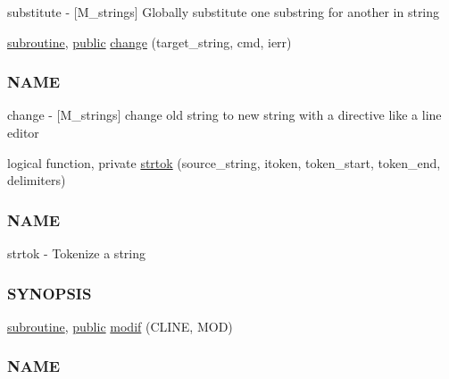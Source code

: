\begin{DoxyCompactItemize}
\begin{DoxyCompactList}
substitute -\/ \mbox{[}M\+\_\+strings\mbox{]} Globally substitute one substring for another in string \end{DoxyCompactList}\item 
\hyperlink{M__stopwatch_83_8txt_acfbcff50169d691ff02d4a123ed70482}{subroutine}, \hyperlink{M__stopwatch_83_8txt_a2f74811300c361e53b430611a7d1769f}{public} \hyperlink{namespacem__strings_a1222f3b718f7637105bde330367925e1}{change} (target\+\_\+string, cmd, ierr)
\begin{DoxyCompactList}\small\item\em \subsubsection*{N\+A\+ME}

change -\/ \mbox{[}M\+\_\+strings\mbox{]} change old string to new string with a directive like a line editor \end{DoxyCompactList}\item 
logical function, private \hyperlink{namespacem__strings_a9a923829f31ea70ecada6d214536a704}{strtok} (source\+\_\+string, itoken, token\+\_\+start, token\+\_\+end, delimiters)
\begin{DoxyCompactList}\small\item\em \subsubsection*{N\+A\+ME}

strtok -\/ Tokenize a string \subsubsection*{S\+Y\+N\+O\+P\+S\+IS}\end{DoxyCompactList}\item 
\hyperlink{M__stopwatch_83_8txt_acfbcff50169d691ff02d4a123ed70482}{subroutine}, \hyperlink{M__stopwatch_83_8txt_a2f74811300c361e53b430611a7d1769f}{public} \hyperlink{namespacem__strings_aec887410b018916a683fbb2ae529f8c5}{modif} (C\+L\+I\+NE, M\+OD)
\begin{DoxyCompactList}\small\item\em \subsubsection*{N\+A\+ME}


\end{DoxyCompactList}
\end{DoxyCompactItemize}
